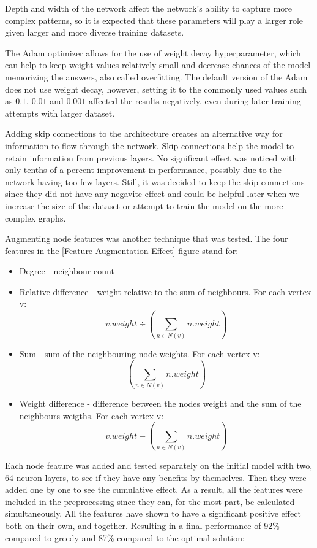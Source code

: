 Depth and width of the network affect the network's ability to capture more complex patterns, so it is expected that these parameters will play a larger role given larger and more diverse training datasets.

The Adam optimizer allows for the use of weight decay hyperparameter, which can help to keep weight values relatively small and decrease chances of the model memorizing the answers, also called overfitting. The default version of the Adam does not use weight decay, however, setting it to the commonly used values such as $0.1$, $0.01$ and $0.001$ affected the results negatively, even during later training attempts with larger dataset.

Adding skip connections to the architecture creates an alternative way for information to flow through the network. Skip connections help the model to retain information from previous layers. No significant effect was noticed with only tenths of a percent improvement in performance, possibly due to the network having too few layers. Still, it was decided to keep the skip connections since they did not have any negavite effect and could be helpful later when we increase the size of the dataset or attempt to train the model on the more complex graphs.

Augmenting node features was another technique that was tested. The four features in the \ref{Feature Augmentation Effect} figure stand for: 
\begin{itemize}
\item Degree - neighbour count
\item Relative difference - weight relative to the sum of neighbours. For each vertex v: \[v.weight  \div  (\sum_{n \in N(v)} n.weight) \]
\item Sum - sum of the neighbouring node weights. For each vertex v: \[ (\sum_{n \in N(v)} n.weight) \]
\item Weight difference - difference between the nodes weight and the sum of the neighbours weigths. For each vertex v: \[ v.weight  -  (\sum_{n \in N(v)} n.weight) \]
\end{itemize}

Each node feature was added and tested separately on the initial model with two, 64 neuron layers, to see if they have any benefits by themselves. Then they were added one by one to see the cumulative effect. As a result, all the features were included in the preprocessing since they can, for the most part, be calculated simultaneously. All the features have shown to have a significant positive effect both on their own, and together. Resulting in a final performance of 92\% compared to greedy and 87\% compared to the optimal solution:

